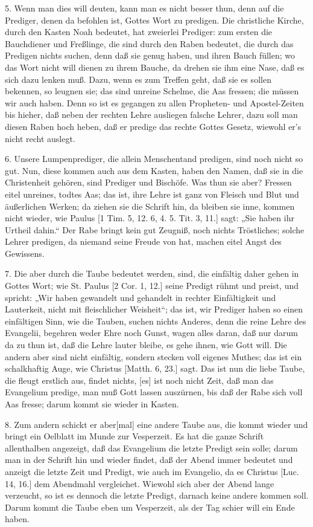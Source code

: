 5. Wenn man dies will deuten, kann man es nicht besser thun, denn auf die Prediger, denen da befohlen ist, Gottes Wort zu predigen. Die christliche Kirche, durch den Kasten Noah bedeutet, hat zweierlei Prediger: zum ersten die Bauchdiener und Freßlinge, die sind durch den Raben bedeutet, die durch das Predigen nichts suchen, denn daß sie genug haben, und ihren Bauch füllen; wo das Wort nicht will dienen zu ihrem Bauche, da drehen sie ihm eine Nase, daß es sich dazu lenken muß. Dazu, wenn es zum Treffen geht, daß sie es sollen bekennen, so leugnen sie; das sind unreine Schelme, die Aas fressen; die müssen wir auch haben. Denn so ist es gegangen zu allen Propheten- und Apostel-Zeiten bis hieher, daß neben der rechten Lehre ausliegen falsche Lehrer, dazu soll man diesen Raben hoch heben, daß er predige das rechte Gottes Gesetz, wiewohl er’s nicht recht auslegt.

6. Unsere Lumpenprediger, die allein Menschentand predigen, sind noch nicht so gut. Nun, diese kommen auch aus dem Kasten, haben den Namen, daß sie in die Christenheit gehören, sind Prediger und Bischöfe. Was thun sie aber? Fressen eitel unreines, todtes Aas; das ist, ihre Lehre ist ganz von Fleisch und Blut und äußerlichen Werken; da ziehen sie die Schrift hin, da bleiben sie inne, kommen nicht wieder, wie Paulus [1 Tim. 5, 12. 6, 4. 5. Tit. 3, 11.] sagt: „Sie haben ihr Urtheil dahin.“ Der Rabe bringt kein gut Zeugniß, noch nichts Tröstliches; solche Lehrer predigen, da niemand seine Freude von hat, machen eitel Angst des Gewissens.

7. Die aber durch die Taube bedeutet werden, sind, die einfältig daher gehen in Gottes Wort; wie St. Paulus [2 Cor. 1, 12.] seine Predigt rühmt und preist, und spricht: „Wir haben gewandelt und gehandelt in rechter Einfältigkeit und Lauterkeit, nicht mit fleischlicher Weisheit“; das ist, wir Prediger haben so einen einfältigen Sinn, wie die Tauben, suchen nichts Anderes, denn die reine Lehre des Evangelii, begehren weder Ehre noch Gunst, wagen alles daran, daß nur darum da zu thun ist, daß die Lehre lauter bleibe, es gehe ihnen, wie Gott
will. Die andern aber sind nicht einfältig, sondern stecken voll eigenes Muthes; das ist ein schalkhaftig Auge, wie Christus [Matth. 6, 23.] sagt. Das ist nun die liebe Taube, die fleugt erstlich aus, findet nichts, [es] ist noch nicht Zeit, daß man das Evangelium predige, man muß Gott lassen auszürnen, bis daß der Rabe sich voll Aas fresse; darum kommt sie wieder in Kasten.

8. Zum andern schickt er aber[mal] eine andere Taube aus, die kommt wieder und bringt ein Oelblatt im Munde zur Vesperzeit. Es hat die ganze Schrift allenthalben angezeigt, daß das Evangelium die letzte Predigt sein solle; darum man in der Schrift hin und wieder findet, daß der Abend immer bedeutet und anzeigt die letzte Zeit und Predigt, wie auch im Evangelio, da es Christus [Luc. 14, 16.] dem Abendmahl vergleichet. Wiewohl sich aber der Abend lange verzeucht, so ist es dennoch die letzte Predigt, darnach keine andere kommen soll. Darum kommt die Taube eben um Vesperzeit, als der Tag schier will ein Ende haben.

